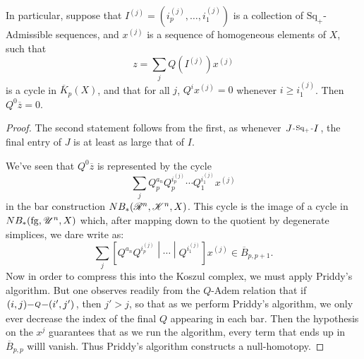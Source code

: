 \documentclass[11pt]{article}
\makeatletter
\newcommand{\PRLie}[1]{\scrR^{#1}}%
\newcommand{\LL}[1]{{\scrK}^{#1}}%
\newcommand{\nontop}[1]{\scrU^{#1}}%
\newcommand{\produces}[3]{{#1}{#3}{#2}}
\newcommand{\forget}{\mathrm{fg}}
\renewcommand{\Q}{Q}
\newcommand{\SqShift}{\Sq_{+}}
\newcommand{\Sq}{\mathrm{Sq}}
\renewcommand{\produces}[3]{
{
\def\labelstyle{\scriptstyle}
\xymatrix@C=2em@1{
{#1}
\ar@{-}[r]|-{{\,#3\,}}
&%
{#2}%
}}}
\makeatother
\begin{document}
\begin{LieLambdaStructureOnKoszul}
\begin{lem*}
In particular, suppose that $I^{(j)}=(i^{(j)}_{p},\ldots,i^{(j)}_{1})$ is a collection of $\SqShift$-Admissible sequences, and $x^{(j)}$ is a sequence of homogeneous elements of $X$, such that
\[z=\sum_{j}Q(I^{(j)})x^{(j)}\]
is a cycle in $\overline{K}_p(X)$, and that for all $j$, $\Q^ix^{(j)}=0$ whenever $i\geq i^{{(j)}}_1$. Then $\Q^0\overline{z}=0$.
\end{lem*}
\begin{proof}
The second statement follows from the first, as whenever $\produces{J}{I}{\SqShift}$, the final entry of $J$ is at least as large that of $I$.

We've seen that $\Q^0\overline{z}$ is represented by the cycle
\[\sum_{j}\Q^{a_n}_p\Q^{i^{{(j)}}_p}_p\cdots \Q^{i^{{(j)}}_1}_1x^{(j)}\]
in the bar construction $N{B_*}(\PRLie{n},\LL{n},X)$. This cycle is the image of a cycle in $NB_*(\forget,\nontop{n},X)$ which, after mapping down to the quotient by degenerate simplices, we dare write as:
\[\sum_{j}\left[\Q^{a_n}\Q^{i^{{(j)}}_p}\middle|\cdots \middle|\Q^{i^{{(j)}}_1}\right]x^{(j)}\in\overline{B}_{p,p+1}.\]
Now in order to compress this into the Koszul complex, we must apply Priddy's algorithm. But one observes readily from the $\Q$-Adem relation that if $\produces{(i,j)}{(i',j')}{\Q}$, then $j'>j$, so that as we perform Priddy's algorithm, we only ever decrease the index of the final $\Q$ appearing in each bar. Then the hypothesis on the $x^{{j}}$ guarantees that as we run the algorithm, every term that ends up in $\overline{B}_{p,p}$ willl vanish. Thus Priddy's algorithm constructs a null-homotopy.
\end{proof}

\end{LieLambdaStructureOnKoszul}
\end{document}
